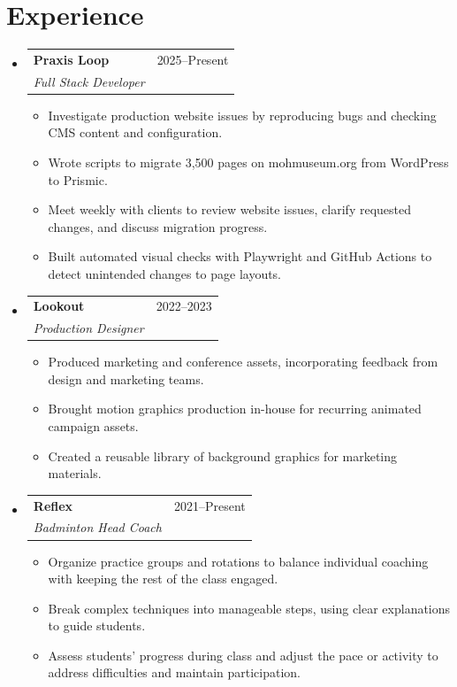 \documentclass[letterpaper,11pt]{article}
\makeatletter
\newcommand{\entry}[4]{\item\begin{tabular*}{0.97\textwidth}[t]{l@{\extracolsep{\fill}}r}\textbf{#1}& #2\\\textit{\small #3}&\textit{\small #4}\\\end{tabular*}\vspace{-7pt}}
\newcommand{\items}{\begin{itemize}[leftmargin=0.17in,itemsep=1pt,topsep=5pt,parsep=0pt]\small}
\newcommand{\finishitems}{\end{itemize}\vspace{-5pt}}
\newcommand{\entries}{\begin{itemize}[leftmargin=0.15in,label={},itemsep=5pt,topsep=2pt]}
\newcommand{\finishentries}{\end{itemize}}
\makeatother
\begin{document}
\section{Experience}
\entries
\entry{Praxis Loop}{2025--Present}{Full Stack Developer}{}
\items
\item Investigate production website issues by reproducing bugs and checking CMS content and configuration.
\item Wrote scripts to migrate 3,500 pages on mohmuseum.org from WordPress to Prismic.
\item Meet weekly with clients to review website issues, clarify requested changes, and discuss migration progress.
\item Built automated visual checks with Playwright and GitHub Actions to detect unintended changes to page layouts.
\finishitems
\entry{Lookout}{2022--2023}{Production Designer}{}
\items
\item Produced marketing and conference assets, incorporating feedback from design and marketing teams.
\item Brought motion graphics production in-house for recurring animated campaign assets.
\item Created a reusable library of background graphics for marketing materials.
\finishitems
\entry{Reflex}{2021--Present}{Badminton Head Coach}{}
\items
\item Organize practice groups and rotations to balance individual coaching with keeping the rest of the class engaged.
\item Break complex techniques into manageable steps, using clear explanations to guide students.
\item Assess students' progress during class and adjust the pace or activity to address difficulties and maintain participation.
\finishitems
\finishentries
\end{document}
